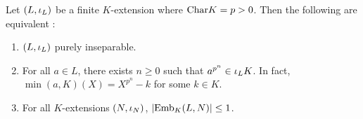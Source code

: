 \documentclass[main.tex]{subfiles}
\begin{document}
\begin{thm}  
  
  Let $(L,\iota_L)$ be a finite $K$-extension where $\mathrm{Char}K = p > 0$.
  Then the following are equivalent : 
  \begin{enumerate}
    \item $(L,\iota_L)$ purely inseparable. 
    \item For all $a \in L$, 
    there exists $n \geq 0$ such that $a^{p^n} \in \iota_L K$. 
    In fact, $\min(a,K)(X) = X^{p^n} - k$ for some $k \in K$.
    \item For all $K$-extensions $(N,\iota_N)$, $|\mathrm{Emb}_{K}(L, N)| \leq 1$. 
  \end{enumerate}
\end{thm}
\end{document}
